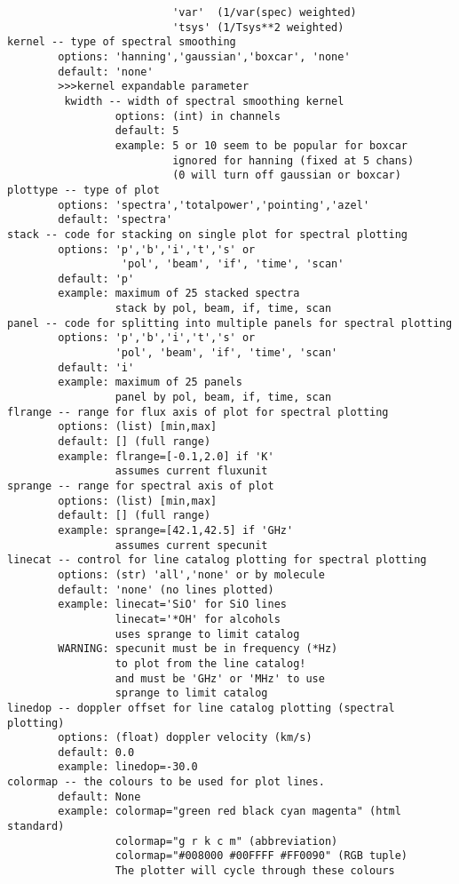 \begin{verbatim}
                          'var'  (1/var(spec) weighted)
                          'tsys' (1/Tsys**2 weighted)
kernel -- type of spectral smoothing
        options: 'hanning','gaussian','boxcar', 'none'
        default: 'none'
        >>>kernel expandable parameter
         kwidth -- width of spectral smoothing kernel
                 options: (int) in channels
                 default: 5
                 example: 5 or 10 seem to be popular for boxcar
                          ignored for hanning (fixed at 5 chans)
                          (0 will turn off gaussian or boxcar)
plottype -- type of plot
        options: 'spectra','totalpower','pointing','azel'
        default: 'spectra'
stack -- code for stacking on single plot for spectral plotting
        options: 'p','b','i','t','s' or
                  'pol', 'beam', 'if', 'time', 'scan'
        default: 'p'
        example: maximum of 25 stacked spectra
                 stack by pol, beam, if, time, scan
panel -- code for splitting into multiple panels for spectral plotting
        options: 'p','b','i','t','s' or
                 'pol', 'beam', 'if', 'time', 'scan'
        default: 'i'
        example: maximum of 25 panels
                 panel by pol, beam, if, time, scan
flrange -- range for flux axis of plot for spectral plotting
        options: (list) [min,max]
        default: [] (full range)
        example: flrange=[-0.1,2.0] if 'K'
                 assumes current fluxunit
sprange -- range for spectral axis of plot
        options: (list) [min,max]
        default: [] (full range)
        example: sprange=[42.1,42.5] if 'GHz'
                 assumes current specunit
linecat -- control for line catalog plotting for spectral plotting
        options: (str) 'all','none' or by molecule
        default: 'none' (no lines plotted)
        example: linecat='SiO' for SiO lines
                 linecat='*OH' for alcohols
                 uses sprange to limit catalog
        WARNING: specunit must be in frequency (*Hz)
                 to plot from the line catalog!
                 and must be 'GHz' or 'MHz' to use
                 sprange to limit catalog
linedop -- doppler offset for line catalog plotting (spectral plotting)
        options: (float) doppler velocity (km/s)
        default: 0.0
        example: linedop=-30.0
colormap -- the colours to be used for plot lines.
        default: None
        example: colormap="green red black cyan magenta" (html standard)
                 colormap="g r k c m" (abbreviation)
                 colormap="#008000 #00FFFF #FF0090" (RGB tuple)
                 The plotter will cycle through these colours

\end{verbatim}
